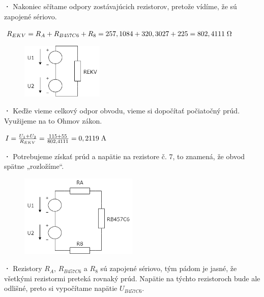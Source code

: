 \textbf{·}
Nakoniec sčítame odpory zostávajúcich rezistorov, pretože vídíme, že sú zapojené sériovo.\\

\begin{center}
$R_{EKV} = R_{A} + R_{B457C6} + R_{8}  = 257,1084 + 320,3027 + 225 = 802,4111 \hspace{0,1cm} \SI{}{\ohm}$
\end{center}

\begin{figure}[h!]
    \centering
    \includegraphics[width=0.35\textwidth]{IEL-Project/pictures/Pr1_7.png}
\end{figure}

\newpage

\textbf{·}
Keďže vieme celkový odpor obvodu, vieme si dopočítať počiatočný prúd. Využijeme na to Ohmov zákon.\\

\begin{center}   
$I = \frac{U_1 + U_2}{R_{EKV}} = \frac{115 + 55}{802,4111} = 0,2119 \hspace{0,1cm} \SI{}{\ampere}$ \\
\end{center}

\textbf{·}
Potrebujeme získať prúd a napätie na rezistore č. 7, to znamená, že obvod spätne „rozložíme“.\\

\begin{figure}[h!]
    \centering
    \includegraphics[width=0.5\textwidth]{IEL-Project/pictures/Pr1_6.png}
\end{figure}

\textbf{·}
Rezistory $R_A$, $R_{B457C6}$ a $R_8$ sú zapojené sériovo, tým pádom je jasné, že všetkými rezistormi preteká rovnaký prúd. Napätie na týchto rezistoroch bude ale odlišné, preto si vypočítame napätie $U_{B457C6}$.

